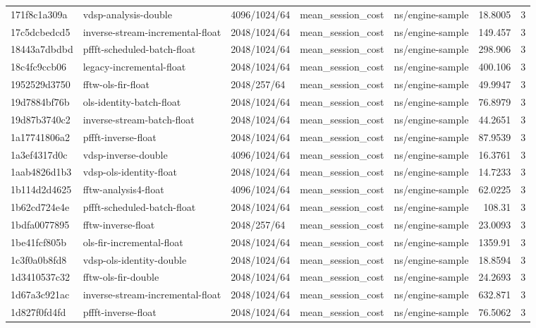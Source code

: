 \begin{longtable}{lllllrr}
171f8c1a309a & vdsp-analysis-double & 4096/1024/64 & mean\_session\_cost & ns/engine-sample & 18.8005 & 3 \\
17c5dcbedcd5 & inverse-stream-incremental-float & 2048/1024/64 & mean\_session\_cost & ns/engine-sample & 149.457 & 3 \\
18443a7dbdbd & pffft-scheduled-batch-float & 2048/1024/64 & mean\_session\_cost & ns/engine-sample & 298.906 & 3 \\
18c4fc9ccb06 & legacy-incremental-float & 2048/1024/64 & mean\_session\_cost & ns/engine-sample & 400.106 & 3 \\
1952529d3750 & fftw-ols-fir-float & 2048/257/64 & mean\_session\_cost & ns/engine-sample & 49.9947 & 3 \\
19d7884bf76b & ols-identity-batch-float & 2048/1024/64 & mean\_session\_cost & ns/engine-sample & 76.8979 & 3 \\
19d87b3740c2 & inverse-stream-batch-float & 2048/1024/64 & mean\_session\_cost & ns/engine-sample & 44.2651 & 3 \\
1a17741806a2 & pffft-inverse-float & 2048/1024/64 & mean\_session\_cost & ns/engine-sample & 87.9539 & 3 \\
1a3ef4317d0c & vdsp-inverse-double & 4096/1024/64 & mean\_session\_cost & ns/engine-sample & 16.3761 & 3 \\
1aab4826d1b3 & vdsp-ols-identity-float & 2048/1024/64 & mean\_session\_cost & ns/engine-sample & 14.7233 & 3 \\
1b114d2d4625 & fftw-analysis4-float & 4096/1024/64 & mean\_session\_cost & ns/engine-sample & 62.0225 & 3 \\
1b62cd724e4e & pffft-scheduled-batch-float & 2048/1024/64 & mean\_session\_cost & ns/engine-sample & 108.31 & 3 \\
1bdfa0077895 & fftw-inverse-float & 2048/257/64 & mean\_session\_cost & ns/engine-sample & 23.0093 & 3 \\
1be41fcf805b & ols-fir-incremental-float & 2048/1024/64 & mean\_session\_cost & ns/engine-sample & 1359.91 & 3 \\
1c3f0a0b8fd8 & vdsp-ols-identity-double & 2048/1024/64 & mean\_session\_cost & ns/engine-sample & 18.8594 & 3 \\
1d3410537c32 & fftw-ols-fir-double & 2048/1024/64 & mean\_session\_cost & ns/engine-sample & 24.2693 & 3 \\
1d67a3c921ac & inverse-stream-incremental-float & 2048/1024/64 & mean\_session\_cost & ns/engine-sample & 632.871 & 3 \\
1d827f0fd4fd & pffft-inverse-float & 2048/1024/64 & mean\_session\_cost & ns/engine-sample & 76.5062 & 3 \\

\end{longtable}
